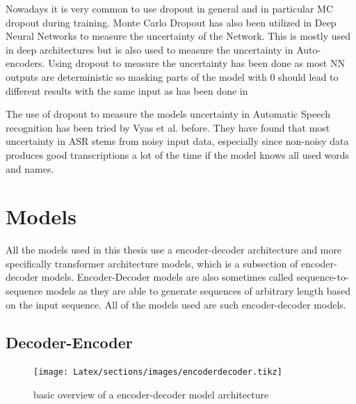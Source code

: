 Nowadays it is very common to use dropout in general and in particular MC dropout during training.
Monte Carlo Dropout has also been utilized in Deep Neural Networks to measure the uncertainty of the Network.   
This is mostly used in deep architectures but is also used to measure the uncertainty in Auto-encoders. \cite{gawlikowski2022surveyuncertaintydeepneural}
Using dropout to measure the uncertainty has been done as most NN outputs are deterministic so masking parts of the model with 0 should lead to different results with the same input as has been done in \cite{gal2016dropoutbayesianapproximationrepresenting}

The use of dropout to measure the models uncertainty in Automatic Speech recognition has been tried by Vyas et al. \cite{8683086} before.
They have found that most uncertainty in ASR stems from noisy input data, especially since non-noisy data produces good transcriptions a lot of the time if the model knows all used words and names. 


\section{Models}
\label{ch:models}
All the models used in this thesis use a encoder-decoder architecture and more specifically transformer architecture models, which is a subsection of encoder-decoder models. Encoder-Decoder models are also sometimes called sequence-to-sequence models as they are able to generate sequences of arbitrary length based on the input sequence.
All of the models used are such encoder-decoder models. 

\subsection{Decoder-Encoder}
\begin{figure}[]
    \centering%
    \texttt{[image: Latex/sections/images/encoderdecoder.tikz]}
    \caption{basic overview of a encoder-decoder model architecture}
    \label{fig:encoderdecodermodel}
\end{figure}

